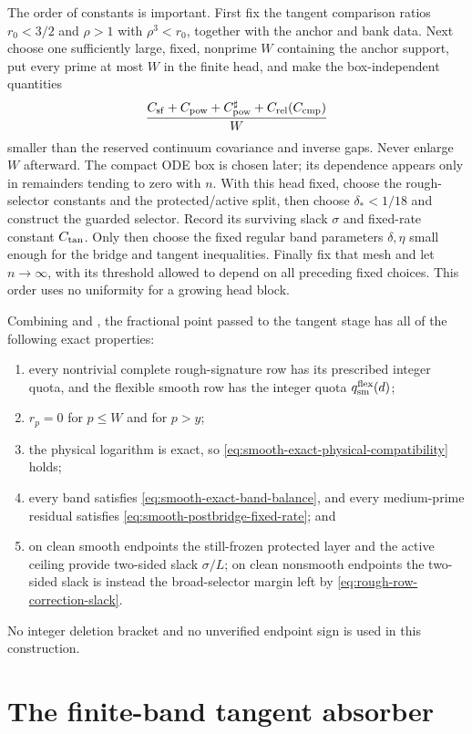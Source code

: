 \documentclass[11pt]{article}
\numberwithin{equation}{section}
\theoremstyle{definition}
\theoremstyle{remark}
\newcommand{\1}{\mathbf 1}
\begin{document}
The order of constants is important.  First fix the tangent comparison
ratios \(r_0<3/2\) and \(\rho>1\) with \(\rho^3<r_0\), together with the
anchor and bank data.  Next choose one sufficiently large, fixed,
nonprime \(W\) containing the anchor support, put every prime at most
\(W\) in the finite head, and make the box-independent quantities
\[
 \frac{C_{\rm sf}+C_{\rm pow}+C_{\rm pow}^{\sharp}
          +C_{\rm rel}(C_{\rm cmp})}{W}
\]
smaller than the reserved continuum covariance and inverse gaps.  Never
enlarge \(W\) afterward.  The compact ODE box is chosen later; its
dependence appears only in remainders tending to zero with \(n\).  With this
head fixed, choose the rough-selector constants and the protected/active
split, then choose \(\delta_*<1/18\) and construct the guarded selector.
Record its surviving slack \(\sigma\) and fixed-rate constant
\(C_{\rm tan}\).  Only then choose the fixed regular band parameters
\(\delta,\eta\) small enough for the bridge and tangent inequalities.
Finally fix that mesh and let \(n\to\infty\), with its threshold allowed
to depend on all preceding fixed choices.  This order uses no uniformity
for a growing head block.

Combining  and
, the fractional point passed to the
tangent stage has all of the following exact properties:
\begin{enumerate}[label=\textup{(\roman*)}]
\item every nontrivial complete rough-signature row has its prescribed
integer quota, and the flexible smooth row has the integer quota
\(q_{\rm sm}^{\rm flex}(d)\);
\item \(r_p=0\) for \(p\leq W\) and for \(p>y\);
\item the physical logarithm is exact, so
\eqref{eq:smooth-exact-physical-compatibility} holds;
\item every band satisfies \eqref{eq:smooth-exact-band-balance}, and every
medium-prime residual satisfies
\eqref{eq:smooth-postbridge-fixed-rate}; and
\item on clean smooth endpoints the still-frozen protected layer and the
active ceiling provide two-sided slack \(\sigma/L\); on clean
nonsmooth endpoints the two-sided slack is instead the broad-selector
margin left by \eqref{eq:rough-row-correction-slack}.
\end{enumerate}
No integer deletion bracket and no unverified endpoint sign is used in
this construction.
 \section{The finite-band tangent absorber}
\label{sec:tangent-absorber}
\end{document}
